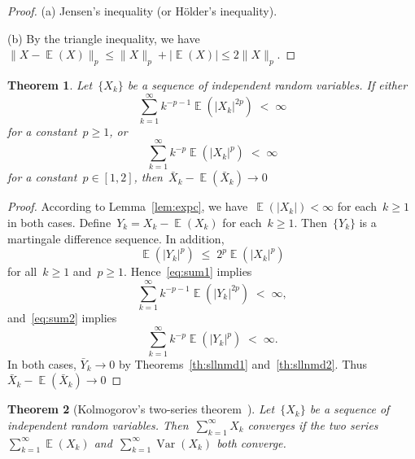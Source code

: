 \documentclass[12pt,a4paper]{article}  %
\newcounter{cite}
\newtheorem{theorem}{Theorem}[section]
\theoremstyle{definition}
\numberwithin{equation}{section}
\newcommand{\as}{{\text{a.s.}}\xspace}
\DeclareMathOperator{\var}{Var}
\DeclareMathOperator{\expc}{\mathbb{E}}
\begin{document}
\begin{proof}
    (a) Jensen's inequality (or H\"older's inequality).

    (b) By the triangle inequality, we have~$\|X - \expc(X)\|_p \le \|X\|_p + |\expc(X)| \le 2\|X\|_p$.
\end{proof}

\begin{theorem}
    \label{th:sllnindep}
    Let~$\{X_k\}$ be a sequence of independent random variables. If
    either
   \begin{equation}
    \label{eq:sum1}
    \sum_{k=1}^\infty k^{-p-1}\expc(|X_k|^{2p}) \;<\; \infty
   \end{equation}
   for a constant~$p\ge 1$, or
   \begin{equation}
    \label{eq:sum2}
    \sum_{k=1}^\infty k^{-p}\expc(|X_k|^{p}) \;<\; \infty
   \end{equation}
   for a constant~$p\in[1, 2]$, then~$\bar{X}_k - \expc(\bar{X}_k)\to 0$ \as
\end{theorem}

\begin{proof}
    According to Lemma~\ref{lem:expc}, we have~$\expc(|X_k|) < \infty$ for each~$k\ge 1$ in both cases.
    Define~$Y_k = X_k - \expc(X_k)$ for each~$k\ge 1$. Then~$\{Y_k\}$ is a martingale difference
    sequence. In addition,
    \[
        \expc(|Y_k|^{p}) \;\le\; 2^{p} \expc(|X_k|^p)
    \]
    for all~$k\ge 1$ and~$p\ge 1$. Hence~\eqref{eq:sum1} implies
   \begin{equation}
    \label{eq:sum1}
    \sum_{k=1}^\infty k^{-p-1}\expc(|Y_k|^{2p}) \;<\; \infty,
   \end{equation}
    and~\eqref{eq:sum2} implies
   \begin{equation}
    \label{eq:sum2}
    \sum_{k=1}^\infty k^{-p}\expc(|Y_k|^{p}) \;<\; \infty.
   \end{equation}
   In both cases, $\bar{Y}_k \to 0$ \as by Theorems~\ref{th:sllnmd1} and~\ref{th:sllnmd2}.
   Thus~$\bar{X}_k - \expc(\bar{X}_k) \to 0$ \as
\end{proof}

\begin{theorem}[Kolmogorov's two-series theorem~\mbox{\cite[Theorems~2.5.6]{Durrett_2019}}]
    \label{th:kolmogorov2}
    Let~$\{X_k\}$ be a sequence of independent random variables.
    Then~$\sum_{k=1}^\infty X_k$ converges \as if the two series~$\sum_{k=1}^\infty \expc(X_k)$
    and~$\sum_{k=1}^\infty \var(X_k)$ both converge.
\end{theorem}
\end{document}
